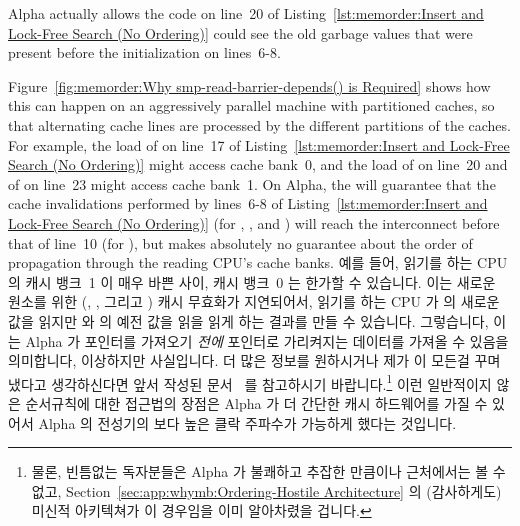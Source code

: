 Alpha actually allows the code on line~20 of
Listing~\ref{lst:memorder:Insert and Lock-Free Search (No Ordering)}
could see the old
garbage values that were present before the initialization on lines~6-8.

Figure~\ref{fig:memorder:Why smp-read-barrier-depends() is Required}
shows how this can happen on
an aggressively parallel machine with partitioned caches, so that
alternating cache lines are processed by the different partitions
of the caches.
For example, the load of  on line~17 of
Listing~\ref{lst:memorder:Insert and Lock-Free Search (No Ordering)}
might access cache bank~0,
and the load of  on line~20 and of  on line~23
might access cache bank~1.
On Alpha, the  will guarantee that the cache invalidations
performed by lines~6-8 of
Listing~\ref{lst:memorder:Insert and Lock-Free Search (No Ordering)}
(for , , and ) will reach
the interconnect before that of line~10 (for ), but
makes absolutely no guarantee about the order of
propagation through the reading CPU's cache banks.
\fi
예를 들어, 읽기를 하는 CPU 의 캐시 뱅크~1 이 매우 바쁜 사이, 캐시 뱅크~0 는
한가할 수 있습니다.
이는 새로운 원소를 위한 (, , 그리고 ) 캐시
무효화가 지연되어서, 읽기를 하는 CPU 가  의 새로운 값을 읽지만
 와  의 예전 값을 읽을 읽게 하는 결과를 만들 수
있습니다.
그렇습니다, 이는 Alpha 가 포인터를 가져오기 {\em 전에} 포인터로 가리켜지는
데이터를 가져올 수 있음을 의미합니다, 이상하지만 사실입니다.
더 많은 정보를 원하시거나 제가 이 모든걸 꾸며냈다고 생각하신다면 앞서 작성된
문서~\cite{Compaq01,WilliamPugh2000Gharachorloo} 를 참고하시기
바랍니다.\footnote{
	물론, 빈틈없는 독자분들은 Alpha 가 불쾌하고 추잡한 만큼이나 근처에서는
	볼 수 없고, Section~\ref{sec:app:whymb:Ordering-Hostile Architecture}
	의 (감사하게도) 미신적 아키텍쳐가 이 경우임을 이미 알아차렸을 겁니다.}
이런 일반적이지 않은 순서규칙에 대한 접근법의 장점은 Alpha 가 더 간단한 캐시
하드웨어를 가질 수 있어서 Alpha 의 전성기의 보다 높은 클락 주파수가 가능하게
했다는 것입니다.

